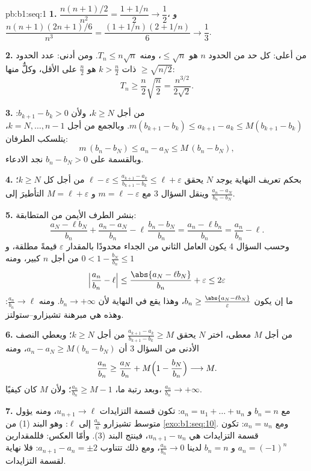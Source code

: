 \begin{solution}{pb:b1:seq:1}
\textbf{1.} $\dfrac{n(n+1)/2}{n^2} = \dfrac{1 + 1/n}{2} \to
\dfrac12$، و $\dfrac{n(n+1)(2n+1)/6}{n^3} = \dfrac{(1 +
1/n)(2 + 1/n)}{6} \to \dfrac13$.

\textbf{2.} من أعلى: كل حد من الحدود $n$ هو $\leq \sqrt n$، ومنه
$T_n \leq n\sqrt n$. ومن أدنى: عدد الحدود ذات $k > \frac n2$
هو $\frac n2$ على الأقل، وكلٌّ منها $\geq \sqrt{n/2}$:
\[
T_n \geq \frac n2 \sqrt{\frac n2} = \frac{n^{3/2}}{2\sqrt 2} .
\]

\textbf{3.} من أجل $k \geq N$، ولأن $b_{k+1} - b_k > 0$:
$m(b_{k+1} - b_k) \leq a_{k+1} - a_k \leq M(b_{k+1} - b_k)$.
وبالجمع من أجل $k = N, \dots, n - 1$، يتلسكب الطرفان:
\[
m\,(b_n - b_N) \leq a_n - a_N \leq M\,(b_n - b_N),
\]
وبالقسمة على $b_n - b_N > 0$ نجد الادعاء.

\textbf{4.} بحكم تعريف النهاية يوجد $N$ يحقق $\ell -
\varepsilon \leq \frac{a_{k+1} - a_k}{b_{k+1} - b_k} \leq \ell +
\varepsilon$ من أجل كل $k \geq N$؛ وينقل السؤال 3 مع $m = \ell -
\varepsilon$ و $M = \ell + \varepsilon$ التأطيرَ
إلى $\frac{a_n - a_N}{b_n - b_N}$.

\textbf{5.} بنشر الطرف الأيمن من المتطابقة:
\[
\frac{a_N - \ell b_N}{b_n} + \frac{a_n - a_N}{b_n} -
\ell\,\frac{b_n - b_N}{b_n}
= \frac{a_n - \ell b_n}{b_n} = \frac{a_n}{b_n} - \ell .
\]
وحسب السؤال 4 يكون العامل الثاني من الجداء محدودًا
بالمقدار $\varepsilon$ قيمةً مطلقة، و $0 < 1 - \frac{b_N}{b_n}
\leq 1$ من أجل $n$ كبير، ومنه
\[
\Bigl|\frac{a_n}{b_n} - \ell\Bigr|
\leq \frac{\abs{a_N - \ell b_N}}{b_n} + \varepsilon
\leq 2\varepsilon
\]
ما إن يكون $b_n \geq \frac{\abs{a_N - \ell b_N}}{\varepsilon}$،
وهذا يقع في النهاية لأن $b_n \to +\infty$. ومنه
$\frac{a_n}{b_n} \to \ell$: وهذه هي مبرهنة تشيزارو--ستولتز.

\textbf{6.} من أجل $M$ معطى، اختر $N$ يحقق $\frac{a_{k+1} -
a_k}{b_{k+1} - b_k} \geq M$ من أجل $k \geq N$؛ ويعطي النصف الأدنى من
السؤال 3 أن $a_n - a_N \geq M(b_n - b_N)$، ومنه
\[
\frac{a_n}{b_n} \geq \frac{a_N}{b_n} +
M\Bigl(1 - \frac{b_N}{b_n}\Bigr) \longrightarrow M .
\]
وبعد رتبة ما، $\frac{a_n}{b_n} \geq M - 1$؛ ولأن $M$ كان
كيفيًا، $\frac{a_n}{b_n} \to +\infty$.

\textbf{7.} مع $b_n = n$ و $a_n = u_1 + \dots + u_n$: تكون
قسمة التزايدات $u_{n+1} \to \ell$، ومنه يؤول متوسط تشيزارو
$\frac{a_n}{n}$ إلى $\ell$: وهو البند (1) من
\cref{exo:b1:seq:10}. ومع $a_n = u_n$: تكون قسمة التزايدات
هي $u_{n+1} - u_n$، فينتج البند (3). وأمّا العكس: فللمقدارين $a_n = (-1)^n$ و
$b_n = n$ لدينا $\frac{a_n}{b_n} \to 0$، ومع ذلك تتناوب $a_{n+1} - a_n = \pm
2$: فلا نهاية لقسمة التزايدات.


\end{solution}
